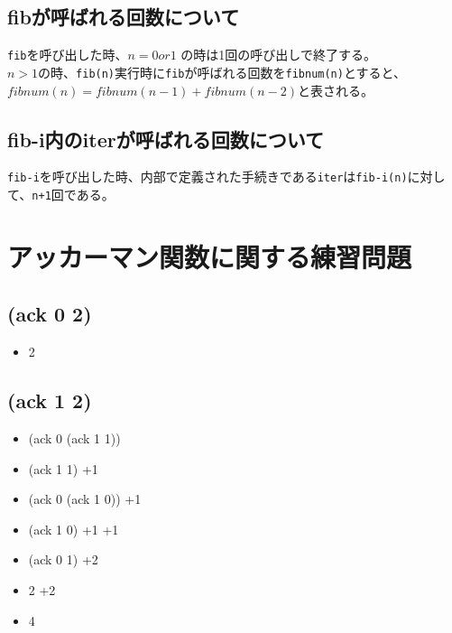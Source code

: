 \documentclass[a4paper,12pt]{article}
\begin{document}
\subsection{fibが呼ばれる回数について}

{\tt fib}を呼び出した時、$n = 0 or 1$ の時は1回の呼び出しで終了する。\\
$n > 1$の時、{\tt fib(n)}実行時に{\tt fib}が呼ばれる回数を{\tt fibnum(n)}とすると、$ fibnum(n) = fibnum(n-1) + fibnum(n-2)$と表される。\\

\subsection{fib-i内のiterが呼ばれる回数について}

{\tt fib-i}を呼び出した時、内部で定義された手続きである{\tt iter}は{\tt fib-i(n)}に対して、{\tt n+1}回である。


\section{アッカーマン関数に関する練習問題}

\subsection{(ack 0 2)}
\begin{itemize}
    \item 2
\end{itemize}
\subsection{(ack 1 2)}
\begin{itemize}
    \item (ack 0 (ack 1 1))
    \item (ack 1 1) +1
    \item (ack 0 (ack 1 0)) +1
    \item (ack 1 0) +1 +1
    \item (ack 0 1) +2
    \item 2 +2
    \item 4
\end{itemize}
\end{document}
